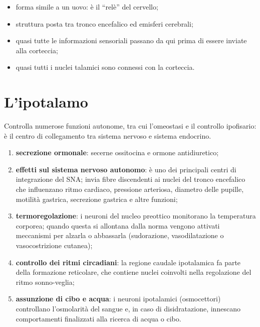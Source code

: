 \begin{itemize}
  \item forma simile a un uovo: è il ``relè'' del cervello;
  \item struttura posta tra tronco encefalico ed emisferi cerebrali;
  \item quasi tutte le informazioni sensoriali passano da qui prima di essere
    inviate alla corteccia;
  \item quasi tutti i nuclei talamici sono connessi con la corteccia.
\end{itemize}

\section{L'ipotalamo}

Controlla numerose funzioni autonome, tra cui l'omeostasi e il controllo
ipofisario: è il centro di collegamento tra sistema nervoso e sistema
endocrino.

\begin{enumerate}
  \item \textbf{secrezione ormonale}: secerne ossitocina e ormone
    antidiuretico;
  \item \textbf{effetti sul sistema nervoso autonomo}: è uno dei principali
    centri di integrazione del SNA; invia fibre discendenti ai nuclei del
    tronco encefalico che influenzano ritmo cardiaco, pressione arteriosa,
    diametro delle pupille, motilità gastrica, secrezione gastrica e altre
    funzioni;
  \item \textbf{termoregolazione}: i neuroni del nucleo preottico monitorano
    la temperatura corporea; quando questa si allontana dalla norma vengono
    attivati meccanismi per alzarla o abbassarla (sudorazione,
    vasodilatazione o vasocostrizione cutanea);
  \item \textbf{controllo dei ritmi circadiani}: la regione caudale
    ipotalamica fa parte della formazione reticolare, che contiene nuclei
    coinvolti nella regolazione del ritmo sonno-veglia;
  \item \textbf{assunzione di cibo e acqua}: i neuroni ipotalamici
    (osmocettori) controllano l'osmolarità del sangue e, in caso di
    disidratazione, innescano comportamenti finalizzati alla ricerca di
    acqua o cibo.
\end{enumerate}

